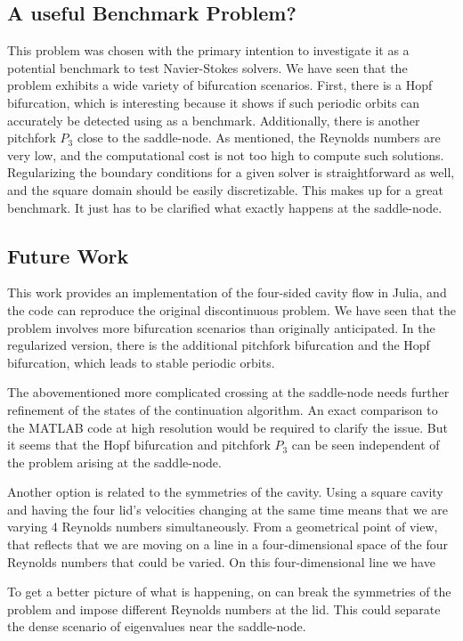 \subsection{A useful Benchmark Problem?}

This problem was chosen with the primary intention to investigate it as a
potential benchmark to test Navier-Stokes solvers. We have seen that the
problem exhibits a wide variety of bifurcation scenarios. First, there is a
Hopf bifurcation, which is interesting because it shows if such periodic orbits
can accurately be detected using as a benchmark. Additionally, there is another
pitchfork $P_3$ close to the saddle-node. As mentioned, the Reynolds numbers
are very low, and the computational cost is not too high to compute such
solutions. Regularizing the boundary conditions for a given solver is
straightforward as well, and the square domain should be easily discretizable.
This makes up for a great benchmark. It just has to be clarified what exactly
happens at the saddle-node.

\subsection{Future Work}

This work provides an implementation of the four-sided cavity flow in Julia,
and the code can reproduce the original discontinuous problem. We have seen
that the problem involves more bifurcation scenarios than originally
anticipated. In the regularized version, there is the additional pitchfork
bifurcation and the Hopf bifurcation, which leads to stable periodic orbits.

The abovementioned more complicated crossing at the saddle-node needs further
refinement of the states of the continuation algorithm. An exact comparison to
the MATLAB code at high resolution would be required to clarify the issue. But
it seems that the Hopf bifurcation and pitchfork $P_3$ can be seen independent of
the problem arising at the saddle-node. 

Another option is related to the symmetries of the cavity. Using a square
cavity and having the four lid's velocities changing at the same time means
that we are varying 4 Reynolds numbers simultaneously. From a geometrical point
of view, that reflects that we are moving on a line in a four-dimensional space
of the four Reynolds numbers that could be varied. On this four-dimensional
line we have 

To get a better picture of what is happening, on can break the symmetries of
the problem and impose different Reynolds numbers at the lid. This could
separate the dense scenario of eigenvalues near the saddle-node.

